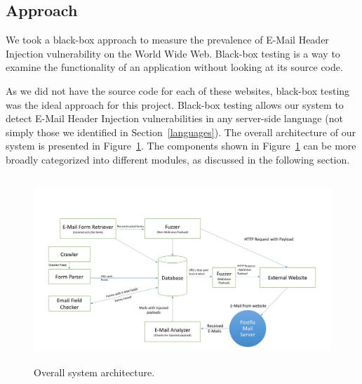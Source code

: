 \subsection{Approach}
\label{sys:appr}
We took a black-box approach to measure the prevalence of E-Mail Header Injection vulnerability on the World Wide Web. Black-box testing \cite{wiki:Black-box_testing} is a way to examine the functionality of an application without looking at its source code.

As we did not have the source code for each of these websites, black-box testing was the ideal approach for this project. Black-box testing allows our system to detect E-Mail Header Injection vulnerabilities in any server-side language (not simply those we identified in Section~\ref{languages}). The overall architecture of our system is presented in Figure~\ref{fig:overall}. The components shown in Figure~\ref{fig:overall} can be more broadly categorized into different modules, as discussed in the following section.

\begin{figure}
	\centering
	\includegraphics[width=14cm, height=7cm]{overall}
	\caption{Overall system architecture.}
	\label{fig:overall}
\end{figure}

